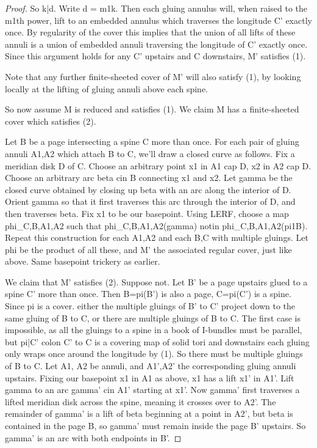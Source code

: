 \documentclass[12pt]{amsart}
\theoremstyle{definition}
\theoremstyle{remark}
\begin{document}
\begin{proof}
So k|d. Write d = m1k. Then each gluing annulus will, when raised to the m1th
power, lift to an embedded annulus which traverses the longitude C' exactly
once.  By regularity of the cover this implies that the union of all lifts of
these annuli is a union of embedded annuli traversing the longitude of C'
exactly once. Since this argument holds for any C' upstairs and C downstairs,
M' satisfies (1).

Note that any further finite-sheeted cover of M' will also satisfy (1), by
looking locally at the lifting of gluing annuli above each spine.

So now assume M is reduced and satisfies (1). We claim M has a finite-sheeted
cover which satisfies (2).

Let B be a page intersecting a spine C more than once. For each pair of gluing
annuli A1,A2 which attach B to C, we'll draw a closed curve as follows. Fix
a meridian disk D of C. Choose an arbitrary point x1 in A1 cap D, x2 in A2 cap
D. Choose an arbitrary arc beta cin B connecting x1 and x2. Let gamma be the
closed curve obtained by closing up beta with an arc along the interior of D.
Orient gamma so that it first traverses this arc through the interior of D, and
then traverses beta.  Fix x1 to be our basepoint. Using LERF, choose a map
phi_C,B,A1,A2 such that phi_C,B,A1,A2(gamma) notin phi_C,B,A1,A2(pi1B). Repeat
this construction for each A1,A2 and each B,C with multiple gluings. Let phi be
the product of all these, and M' the associated regular cover, just like above.
Same basepoint trickery as earlier.

We claim that M' satisfies (2). Suppose not. Let B' be a page upstairs glued to
a spine C' more than once. Then B=pi(B') is also a page, C=pi(C') is a spine.
Since pi is a cover. either the multiple gluings of B' to C' project down to
the same gluing of B to C, or there are multiple gluings of B to C. The first
case is impossible, as all the gluings to a spine in a book of I-bundles must
be parallel, but pi|C' colon C' to C is a covering map of solid tori and
downstairs each gluing only wraps once around the longitude by (1). So there
must be multiple gluings of B to C. Let A1, A2 be annuli, and A1',A2' the
corresponding gluing annuli upstairs. Fixing our basepoint x1 in A1 as above,
x1 has a lift x1' in A1'. Lift gamma to an arc gamma' cin A1' starting at x1'.
Now gamma' first traverses a lifted meridian disk across the spine, meaning it
crosses over to A2'. The remainder of gamma' is a lift of beta beginning at
a point in A2', but beta is contained in the page B, so gamma' must remain
inside the page B' upstairs. So gamma' is an arc with both endpoints in B'.


\end{proof}
\end{document}
